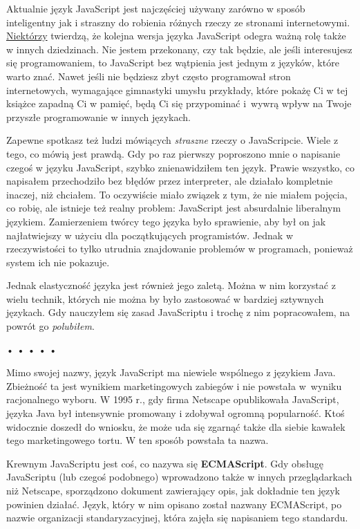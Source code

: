   
Aktualnie język JavaScript jest najczęściej używany zarówno w sposób inteligentny jak i straszny do robienia różnych rzeczy ze stronami internetowymi. \href{http://steve-yegge.blogspot.com/2007/02/next-big-language.html}{Niektórzy} twierdzą, że kolejna wersja języka JavaScript odegra ważną rolę także w innych dziedzinach. Nie jestem przekonany, czy tak będzie, ale jeśli interesujesz się programowaniem, to JavaScript bez wątpienia jest jednym z języków, które warto znać. Nawet jeśli nie będziesz zbyt często programował stron internetowych, wymagające gimnastyki umysłu przykłady, które pokażę Ci w tej książce zapadną Ci w pamięć, będą Ci się przypominać i~wywrą wpływ na Twoje przyszłe programowanie w innych językach.

  
Zapewne spotkasz też ludzi mówiących \emph{straszne} rzeczy o JavaScripcie. Wiele z tego, co mówią jest prawdą. Gdy po raz pierwszy poproszono mnie o napisanie czegoś w języku JavaScript, szybko znienawidziłem ten język. Prawie wszystko, co napisałem przechodziło bez błędów przez interpreter, ale działało kompletnie inaczej, niż chciałem. To oczywiście miało związek z tym, że nie miałem pojęcia, co robię, ale istnieje też realny problem: JavaScript jest absurdalnie liberalnym językiem. Zamierzeniem twórcy tego języka było sprawienie, aby był on jak najłatwiejszy w użyciu dla początkujących programistów. Jednak w rzeczywistości to tylko utrudnia znajdowanie problemów w programach, ponieważ system ich nie pokazuje.

  
Jednak elastyczność języka jest również jego zaletą. Można w nim korzystać z wielu technik, których nie można by było zastosować w bardziej sztywnych językach. Gdy nauczyłem się zasad JavaScriptu i trochę z nim popracowałem, na powrót go \emph{polubiłem}.


\begin{center}
• • • • •
\end{center}

  
Mimo swojej nazwy, język JavaScript ma niewiele wspólnego z językiem Java. Zbieżność ta jest wynikiem marketingowych zabiegów i nie powstała w~wyniku racjonalnego wyboru. W 1995 r., gdy firma Netscape opublikowała JavaScript, języka Java był intensywnie promowany i zdobywał ogromną popularność. Ktoś widocznie doszedł do wniosku, że może uda się zgarnąć także dla siebie kawałek tego marketingowego tortu. W ten sposób powstała ta nazwa.

  
Krewnym JavaScriptu jest coś, co nazywa się \textbf{ECMAScript}. Gdy obsługę JavaScriptu (lub czegoś podobnego) wprowadzono także w innych przeglądarkach niż Netscape, sporządzono dokument zawierający opis, jak dokładnie ten język powinien działać. Język, który w nim opisano został nazwany ECMAScript, po nazwie organizacji standaryzacyjnej, która zajęła się napisaniem tego standardu.

